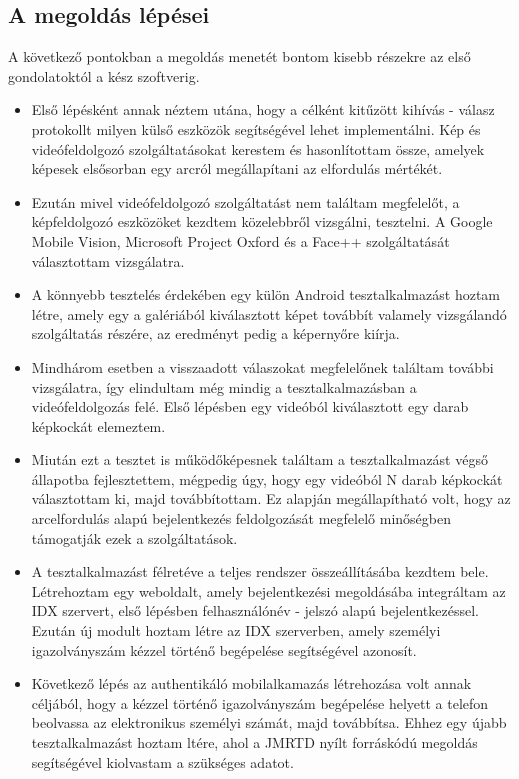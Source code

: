 \subsection{A megoldás lépései}
A következő pontokban a megoldás menetét bontom kisebb részekre az első gondolatoktól a kész szoftverig.
\begin{itemize}
\item Első lépésként annak néztem utána, hogy a célként kitűzött kihívás - válasz protokollt milyen külső eszközök segítségével lehet implementálni.  Kép és videófeldolgozó szolgáltatásokat kerestem és hasonlítottam össze, amelyek képesek elsősorban egy arcról megállapítani az elfordulás mértékét.
\item Ezután mivel videófeldolgozó szolgáltatást nem találtam megfelelőt, a képfeldolgozó eszközöket kezdtem közelebbről vizsgálni, tesztelni. A Google Mobile Vision, Microsoft Project Oxford és a Face++ szolgáltatását választottam vizsgálatra.
\item A könnyebb tesztelés érdekében egy külön Android tesztalkalmazást hoztam létre, amely egy a galériából kiválasztott képet továbbít valamely vizsgálandó szolgáltatás részére, az eredményt pedig a képernyőre kiírja.
\item Mindhárom esetben a visszaadott válaszokat megfelelőnek találtam további vizsgálatra, így elindultam még mindig a tesztalkalmazásban a videófeldolgozás felé. Első lépésben egy videóból kiválasztott egy darab képkockát elemeztem.
\item Miután ezt a tesztet is működőképesnek találtam a tesztalkalmazást végső állapotba fejlesztettem, mégpedig úgy, hogy egy videóból N darab képkockát választottam ki, majd továbbítottam. Ez alapján megállapítható volt, hogy az arcelfordulás alapú bejelentkezés feldolgozását megfelelő minőségben támogatják ezek a szolgáltatások.
\item A tesztalkalmazást félretéve a teljes rendszer összeállításába kezdtem bele. Létrehoztam egy weboldalt, amely bejelentkezési megoldásába integráltam az IDX szervert, első lépésben felhasználónév - jelszó alapú bejelentkezéssel. Ezután új modult hoztam létre az IDX szerverben, amely személyi igazolványszám kézzel történő begépelése segítségével azonosít.
\item Következő lépés az authentikáló mobilalkamazás létrehozása volt annak céljából, hogy a kézzel történő igazolványszám begépelése helyett a telefon beolvassa az elektronikus személyi számát, majd továbbítsa. Ehhez egy újabb tesztalkalmazást hoztam ltére, ahol a JMRTD nyílt forráskódú megoldás segítségével kiolvastam a szükséges adatot.

\end{itemize}

